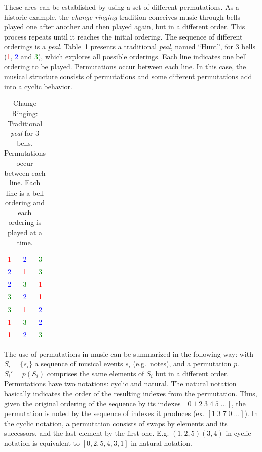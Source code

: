 These arcs can be established by using a set of different permutations. As a historic
example, the \emph{change ringing} tradition conceives music through
bells played one after another and then played again, but in a different
order. This process repeats until it reaches the initial ordering. The sequence of
different orderings is a \emph{peal}. Table~\ref{tab:change}
presents a traditional \emph{peal}, named ``Hunt'', for 3 bells (\textcolor{red}{1}, \textcolor{blue}{2} and \textcolor{green}{3}), which explores
all possible orderings. Each line indicates one bell ordering to be
played. Permutations occur between each line. In this case, the musical structure
consists of permutations and some different permutations add into a
cyclic behavior.

\begin{table}[htp!]
\centering
\caption{Change Ringing: Traditional \emph{peal} for 3 bells. Permutations
occur between each line. Each line is a bell ordering and each ordering is played at a time.} 
\begin{tabular}{l c r}
\textcolor{red}{1} & \textcolor{blue}{2} & \textcolor{green}{3} \\
\textcolor{blue}{2} & \textcolor{red}{1} & \textcolor{green}{3} \\
\textcolor{blue}{2} & \textcolor{green}{3} & \textcolor{red}{1} \\
\textcolor{green}{3} & \textcolor{blue}{2} & \textcolor{red}{1} \\
\textcolor{green}{3} & \textcolor{red}{1} & \textcolor{blue}{2} \\
\textcolor{red}{1} & \textcolor{green}{3} & \textcolor{blue}{2} \\
\textcolor{red}{1} & \textcolor{blue}{2} & \textcolor{green}{3}
\end{tabular}
\label{tab:change}
\end{table}

The use of permutations in music can be summarized in the following way:
with $S_i=\{s_i\}$ a sequence of musical events $s_i$ (e.g.\ notes), and a
permutation $p$. $S_i'=p(S_i)$ comprises the same elements of $S_i$ but in a
different order. Permutations have two notations: cyclic and
natural. The natural notation basically indicates the order of the resulting indexes from
the permutation. Thus, given the original ordering of the sequence by its indexes $[0\;1\;2\;3\;4\;5\;...]$, the permutation is noted by the sequence of indexes it
produces (ex. $[1\;3\;7\;0\;...]$). In the cyclic notation, a permutation consists
of swaps by elements and its successors, and the last element by the first one.
E.g. $(1,2,5)(3,4)$ in cyclic notation is equivalent to $[0,2,5,4,3,1]$ in natural notation.


